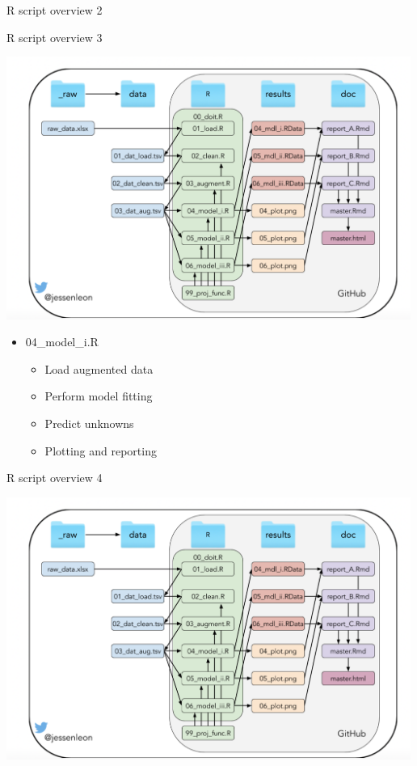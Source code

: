 \documentclass[ignorenonframetext,]{beamer}
\providecommand{\tightlist}{%
  \setlength{\itemsep}{0pt}\setlength{\parskip}{0pt}}
\begin{document}
\begin{frame}
\begin{block}{R script overview 2}
\end{block}

\begin{block}{R script overview 3}

\includegraphics[width=5.20833in,height=\textheight]{project_organisation.png}

\begin{itemize}
\tightlist
\item
  04\_model\_i.R

  \begin{itemize}
  \tightlist
  \item
    Load augmented data
  \item
    Perform model fitting
  \item
    Predict unknowns
  \item
    Plotting and reporting
  \end{itemize}
\end{itemize}

\end{block}

\begin{block}{R script overview 4}

\includegraphics[width=5.20833in,height=\textheight]{project_organisation.png}


\end{block}
\end{frame}
\end{document}
